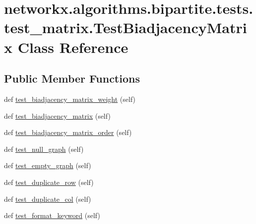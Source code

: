 \hypertarget{classnetworkx_1_1algorithms_1_1bipartite_1_1tests_1_1test__matrix_1_1TestBiadjacencyMatrix}{}\section{networkx.\+algorithms.\+bipartite.\+tests.\+test\+\_\+matrix.\+Test\+Biadjacency\+Matrix Class Reference}
\label{classnetworkx_1_1algorithms_1_1bipartite_1_1tests_1_1test__matrix_1_1TestBiadjacencyMatrix}
\subsection*{Public Member Functions}
\begin{DoxyCompactItemize}
\item 
def \hyperlink{classnetworkx_1_1algorithms_1_1bipartite_1_1tests_1_1test__matrix_1_1TestBiadjacencyMatrix_a3201c81dac67a18deeac21396535f962}{test\+\_\+biadjacency\+\_\+matrix\+\_\+weight} (self)
\item 
def \hyperlink{classnetworkx_1_1algorithms_1_1bipartite_1_1tests_1_1test__matrix_1_1TestBiadjacencyMatrix_a15825629a9d4c07d5ac9a0cf107c9c89}{test\+\_\+biadjacency\+\_\+matrix} (self)
\item 
def \hyperlink{classnetworkx_1_1algorithms_1_1bipartite_1_1tests_1_1test__matrix_1_1TestBiadjacencyMatrix_aac5257b9170ffe650f9667fbfda5bb98}{test\+\_\+biadjacency\+\_\+matrix\+\_\+order} (self)
\item 
def \hyperlink{classnetworkx_1_1algorithms_1_1bipartite_1_1tests_1_1test__matrix_1_1TestBiadjacencyMatrix_a3281f0c95d42450fec9dcce18e4456ff}{test\+\_\+null\+\_\+graph} (self)
\item 
def \hyperlink{classnetworkx_1_1algorithms_1_1bipartite_1_1tests_1_1test__matrix_1_1TestBiadjacencyMatrix_ad080e9ee957f0e7c83c91672f0288946}{test\+\_\+empty\+\_\+graph} (self)
\item 
def \hyperlink{classnetworkx_1_1algorithms_1_1bipartite_1_1tests_1_1test__matrix_1_1TestBiadjacencyMatrix_a888268ef86a6de3fdc4f08c03b4fd394}{test\+\_\+duplicate\+\_\+row} (self)
\item 
def \hyperlink{classnetworkx_1_1algorithms_1_1bipartite_1_1tests_1_1test__matrix_1_1TestBiadjacencyMatrix_ab751ab567eb15a374314aeef83719561}{test\+\_\+duplicate\+\_\+col} (self)
\item 
def \hyperlink{classnetworkx_1_1algorithms_1_1bipartite_1_1tests_1_1test__matrix_1_1TestBiadjacencyMatrix_a5ded39cf7d21c9e09b417dc187d41056}{test\+\_\+format\+\_\+keyword} (self)

\end{DoxyCompactItemize}
